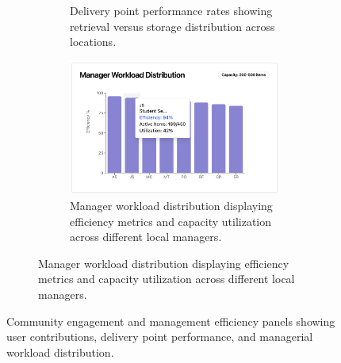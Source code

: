 \begin{figure}[h]
\begin{subfigure}[b]{0.49\textwidth}
\begin{subfigure}[b]{\textwidth}
            \caption{Delivery point performance rates showing retrieval versus storage distribution across locations.}
            \label{fig:web_performance_rates}
        \end{subfigure}
        \vfill
        \begin{subfigure}[b]{\textwidth}
            \centering
            \includegraphics[width=\textwidth]{figs/appendix/web/4B2.png}
            \caption{Manager workload distribution displaying efficiency metrics and capacity utilization across different local managers.}
            \label{fig:web_manager_workload}
        \end{subfigure}
    \end{subfigure}
    \caption{Community engagement and management efficiency panels showing user contributions, delivery point performance, and managerial workload distribution.}
    \label{fig:web_community_management}
\end{figure}

